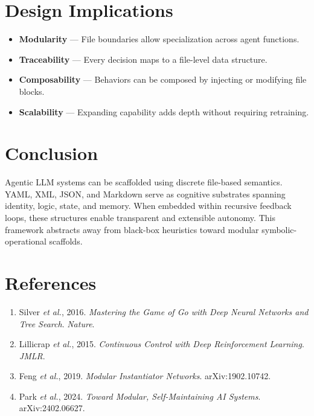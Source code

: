 \documentclass{article}
\begin{document}
\section{Design Implications}
\begin{itemize}
  \item \textbf{Modularity} — File boundaries allow specialization across agent functions.
  \item \textbf{Traceability} — Every decision maps to a file-level data structure.
  \item \textbf{Composability} — Behaviors can be composed by injecting or modifying file blocks.
  \item \textbf{Scalability} — Expanding capability adds depth without requiring retraining.
\end{itemize}

\section{Conclusion}
Agentic LLM systems can be scaffolded using discrete file-based semantics. YAML, XML, JSON, and Markdown serve as cognitive substrates spanning identity, logic, state, and memory. When embedded within recursive feedback loops, these structures enable transparent and extensible autonomy. This framework abstracts away from black-box heuristics toward modular symbolic-operational scaffolds.

\section*{References}
\begin{enumerate}
\item Silver \textit{et al.}, 2016. \textit{Mastering the Game of Go with Deep Neural Networks and Tree Search}. \textit{Nature}.
\item Lillicrap \textit{et al.}, 2015. \textit{Continuous Control with Deep Reinforcement Learning}. \textit{JMLR}.
\item Feng \textit{et al.}, 2019. \textit{Modular Instantiator Networks}. arXiv:1902.10742.
\item Park \textit{et al.}, 2024. \textit{Toward Modular, Self-Maintaining AI Systems}. arXiv:2402.06627.
\end{enumerate}
\end{document}

